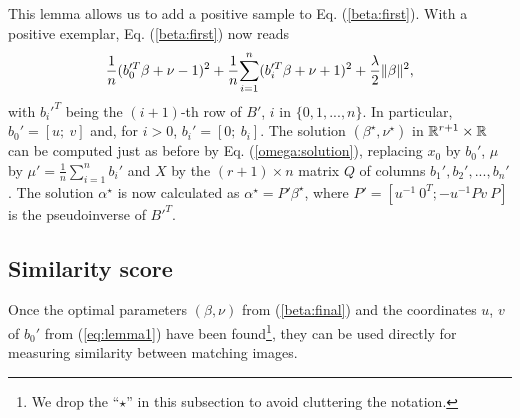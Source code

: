 This lemma allows us to add a positive sample to Eq. (\ref{beta:first}).
With a positive exemplar, Eq. (\ref{beta:first}) now reads
\begin{align}
 \dfrac{1}{n}(b_0'^T\beta+\nu - 1)^2 +\dfrac{1}{n}\displaystyle{\sum_{i=1}^n} (b_i'^T\beta+\nu + 1)^2
+\dfrac{\lambda}{2}\|\beta\|^2,\label{beta:final}
\end{align}
with $b_i'^T$ being the $(i+1)$-th row of $B'$, $i$ in $\{0,1,...,n\}$. In particular, $b_0'=[u; \ v]$ and, for $i>0$, $b_i'=[0; \ b_i]$. The solution $(\beta^\star,\nu^\star)$ in $\mathbb R^{r+1}\times\mathbb R$ can be computed just as before by Eq. (\ref{omega:solution}), replacing $x_0$ by $b_0'$, $\mu$ by $\mu' = \frac{1}{n}\sum_{i=1}^n b_i'$ and $X$ by the $(r+1)\times n$ matrix $Q$ of columns $b_1', b_2',...,b_n'$. The solution $\alpha^\star$ is now calculated as
$\alpha^\star=P'\beta^\star$, where $P' = [u^{-1} \ 0^T; -u^{-1}Pv \ P]$ is the pseudoinverse of $B'^T$. 


\subsection{Similarity score}\label{simi_score}
Once the optimal parameters $(\beta, \nu)$ from (\ref{beta:final}) and the coordinates $u$, $v$ of $b_0'$ from (\ref{eq:lemma1}) have been found\footnote{We drop the ``$\star$'' in this subsection to avoid cluttering the notation.}, they can be used directly for measuring similarity between matching images.

